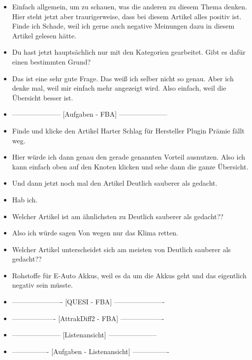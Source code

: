 {\begin{itemize}[]
        \item {} Einfach allgemein, um zu schauen, was die anderen zu diesem Thema denken.
              Hier steht jetzt aber traurigerweise, dass bei diesem Artikel alles positiv ist.
              Finde ich Schade, weil ich gerne auch negative Meinungen dazu in diesem Artikel gelesen hätte.
        \item {} Du hast jetzt hauptsächlich nur mit den Kategorien gearbeitet. Gibt es dafür einen bestimmten Grund?
        \item {} Das ist eine sehr gute Frage.
              Das weiß ich selber nicht so genau.
              Aber ich denke mal, weil mir einfach mehr angezeigt wird.
              Also einfach, weil die Übersicht besser ist.
        \item {---------------------} [Aufgaben - FBA] {---------------------}
        \item {} Finde und klicke den Artikel \flqq Harter Schlag für Hersteller Plugin Prämie fällt weg\frqq{}.
        \item {} Hier würde ich dann genau den gerade genannten Vorteil ausnutzen.
              Also ich kann einfach oben auf den Knoten klicken und sehe dann die ganze Übersicht.
        \item {} Und dann jetzt noch mal den Artikel \flqq Deutlich sauberer als gedacht\frqq{}.
        \item {} Hab ich.
        \item {} Welcher Artikel ist am ähnlichsten zu \flqq Deutlich sauberer als gedacht?\frqq{}?
        \item {} Also ich würde sagen \flqq Von wegen nur das Klima retten\frqq{}.
        \item {} Welcher Artikel unterscheidet sich am meisten von \flqq Deutlich sauberer als gedacht?\frqq{}?
        \item {} \flqq Rohstoffe für E-Auto Akkus\frqq{}, weil es da um die Akkus geht und das eigentlich negativ sein müsste.
        \item {----------------------} [QUESI - FBA] {----------------------}
        \item {-------------------} [AttrakDiff2 - FBA] {-------------------}
        \item {---------------------} [Listenansicht] {---------------------}
        \item {----------------} [Aufgaben - Listenansicht] {----------------}

\end{itemize}}
